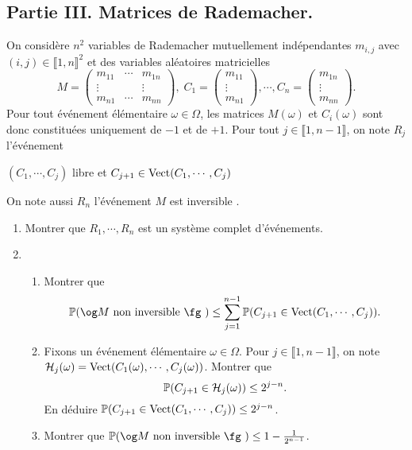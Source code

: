 \subsection*{Partie III. Matrices de Rademacher.}
On considère $n^2$ variables de Rademacher mutuellement indépendantes $m_{i,j}$ avec $(i,j)\in \llbracket 1,n\rrbracket^2$ et des variables aléatoires matricielles
\[
 M = 
 \begin{pmatrix}
  m_{11} & \cdots & m_{1n} \\
  \vdots &        & \vdots \\
  m_{n1} & \cdots & m_{nn}
 \end{pmatrix}, \;
 C_1=
 \begin{pmatrix}
  m_{11} \\ \vdots \\ m_{n1}
 \end{pmatrix}, \cdots, 
 C_n =
 \begin{pmatrix}
  m_{1n} \\ \vdots \\ m_{nn}
 \end{pmatrix}.
\]
Pour tout événement élémentaire $\omega \in \Omega$, les matrices $M(\omega)$ et $C_i(\omega)$ sont donc constituées uniquement de $-1$ et de $+1$.\newline
Pour tout $j\in\llbracket 1, n-1\rrbracket$, on note $R_j$ l'événement
\begin{center}
 \og $(C_1, \cdots, C_j)$ libre et $C_{j+1} \in \operatorname{Vect}(C_1,\cdots,C_j)$ \fg
\end{center}
On note aussi $R_n$ l'événement \og $M$ est inversible \fg. 
\begin{enumerate}
 \item Montrer que $R_1, \cdots, R_n$ est un système complet d'événements.
 \item 
 \begin{enumerate}
  \item Montrer que 
 \[
  \P(\text{\og$M$ non inversible \fg }) \leq \sum_{j=1}^{n-1}\p(C_{j+1} \in \Vect(C_1,\cdots,C_j)).
 \]
 \item Fixons un événement élémentaire $\omega\in \Omega$. Pour $j\in \llbracket 1, n-1\rrbracket$, on note $\mathcal{H}_j(\omega)=\operatorname{Vect}(C_1(\omega),\cdots,C_j(\omega))$. Montrer que 
 \[
  \mathbb{P}(C_{j+1} \in \mathcal{H}_j(\omega)) \leq 2^{j-n}.
 \]
En déduire $\mathbb{P}(C_{j+1} \in \operatorname{Vect}(C_1,\cdots,C_j))\leq 2^{j-n}$.
 \item Montrer que $\P(\text{\og$M$ non inversible \fg }) \leq 1 - \frac{1}{2^{n-1}}$.
 \end{enumerate}
\end{enumerate}


